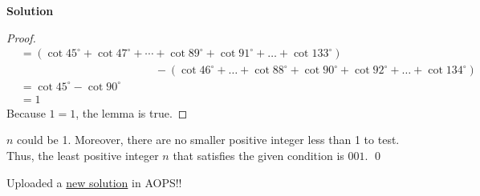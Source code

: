 \documentclass{article}
\newenvironment{solution}{\begin{trivlist}\item[]{\bf Solution}}{\qed \end{trivlist}}
\begin{document}
\begin{solution}
\begin{proof}
\begin{align*}
    &= (\cot 45^\circ + \cot 47^\circ + \cdots + \cot 89^\circ + \cot 91^\circ + \dots + \cot 133^\circ) \\
    &\qquad\qquad\qquad\qquad\qquad\qquad - (\cot 46^\circ + \dots + \cot 88^\circ + \cot 90^\circ + \cot 92^\circ + \dots + \cot 134^\circ) \\
    &= \cot 45^\circ - \cot 90^\circ \\
    &= 1
\end{align*}
Because $1 = 1$, the lemma is true.
\end{proof}
\noindent
$n$ could be 1. Moreover, there are no smaller positive integer less than 1 to test. Thus, the least positive integer $n$ that satisfies the given condition is $\boxed{001}$.
\end{solution}
Uploaded a \href{https://artofproblemsolving.com/wiki/index.php/2000_AIME_II_Problems/Problem_15#Solution_4}{new solution} in AOPS!! \\

\newpage
\end{document}
